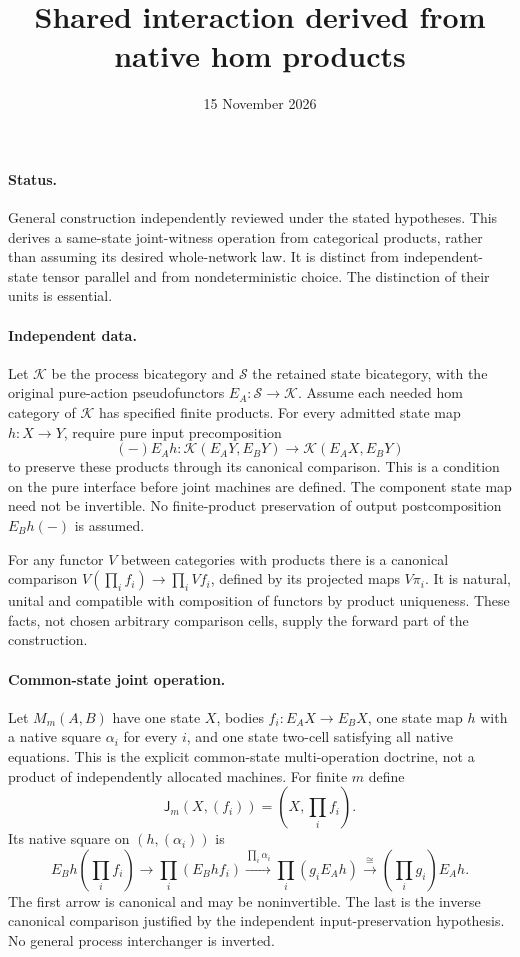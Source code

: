 \documentclass{article}
\title{Shared interaction derived from native hom products}
\date{15 November 2026}
\begin{document}
\maketitle
\paragraph{Status.} General construction independently reviewed under the stated hypotheses. This derives a same-state joint-witness operation from categorical products, rather than assuming its desired whole-network law. It is distinct from independent-state tensor parallel and from nondeterministic choice. The distinction of their units is essential.

\paragraph{Independent data.} Let $\mathcal K$ be the process bicategory and $\mathcal S$ the retained state bicategory, with the original pure-action pseudofunctors $E_A:\mathcal S\to\mathcal K$. Assume each needed hom category of $\mathcal K$ has specified finite products. For every admitted state map $h:X\to Y$, require pure input precomposition
\[
 (-)E_Ah:\mathcal K(E_AY,E_BY)\to\mathcal K(E_AX,E_BY)
\]
to preserve these products through its canonical comparison. This is a condition on the pure interface before joint machines are defined. The component state map need not be invertible. No finite-product preservation of output postcomposition $E_Bh(-)$ is assumed.

For any functor $V$ between categories with products there is a canonical comparison $V(\prod_i f_i)\to\prod_i Vf_i$, defined by its projected maps $V\pi_i$. It is natural, unital and compatible with composition of functors by product uniqueness. These facts, not chosen arbitrary comparison cells, supply the forward part of the construction.

\paragraph{Common-state joint operation.} Let $M_m(A,B)$ have one state $X$, bodies $f_i:E_AX\to E_BX$, one state map $h$ with a native square $\alpha_i$ for every $i$, and one state two-cell satisfying all native equations. This is the explicit common-state multi-operation doctrine, not a product of independently allocated machines. For finite $m$ define
\[
 \mathsf J_m(X,(f_i))=(X,\prod_i f_i).
\tag{1}
\]
Its native square on $(h,(\alpha_i))$ is
\[
 E_Bh(\prod_i f_i)
 \longrightarrow\prod_i(E_Bh f_i)
 \xrightarrow{\prod_i\alpha_i}\prod_i(g_i E_Ah)
 \xrightarrow{\cong}(\prod_i g_i)E_Ah.
\tag{2}
\]
The first arrow is canonical and may be noninvertible. The last is the inverse canonical comparison justified by the independent input-preservation hypothesis. No general process interchanger is inverted.
\end{document}
